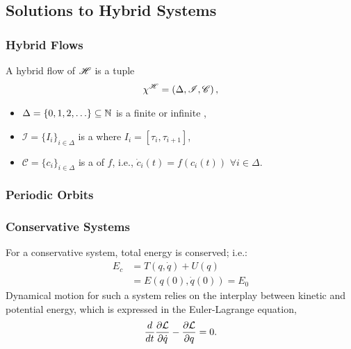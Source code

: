 \documentclass{beamer}
\begin{document}
\subsection{Solutions to Hybrid Systems}
\begin{frame}[t]
  \frametitle{Hybrid Flows}
  A \alert{hybrid flow} of $\mathscr{H}$ is a tuple
  \begin{align*}
    \chi^{\mathscr{H}} = \left( \Delta, \mathscr{I}, \mathscr{C} \right),
  \end{align*}
  \vspace{-2em}
  \begin{itemize}
    \item $\Delta = \{0, 1, 2, \ldots\} \subseteq \mathbb{N}$ is a finite or infinite ,
    \item $\mathscr{I} = \{I_{i} \}_{i \in \Delta}$ is a  where $I_{i} = [\tau_{i}, \tau_{i + 1}]$,
    \item $\mathscr{C} = \{c_{i} \}_{i \in \Delta}$ is a  of $f$, i.e., ${\dot c}_{i}(t) = f(c_{i}(t))$ $\forall i \in \Delta$.
  \end{itemize}

\end{frame}


\begin{frame}
  \frametitle{Periodic Orbits}
\end{frame}

\begin{frame}
  \frametitle{Conservative Systems}
  For a conservative system, total energy is conserved; i.e.:
  \begin{align*}
    E_{c} &= T(q, \dot q) + U(q)\\
    &= E(q(0), \dot q(0)) = E_{0}
  \end{align*}
  Dynamical motion for such a system relies on the interplay between kinetic and potential energy, which is expressed in the Euler-Lagrange equation,
  \begin{align*}
    \frac{d}{dt} \frac{\partial{\ensuremath{\mathcal{L}}}}{\partial{\ensuremath{\dot q}}} - \frac{\partial{\ensuremath{\mathcal{L}}}}{\partial{\ensuremath{q}}} = 0.
  \end{align*}
\end{frame}
\end{document}
